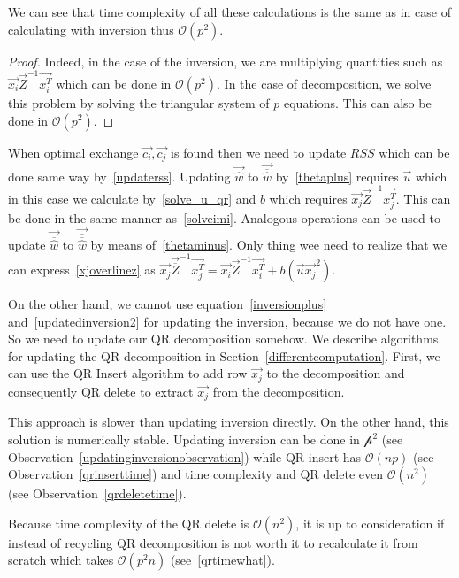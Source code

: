 \begin{observation}
We can see that time complexity of all these calculations is the same as in case of calculating with inversion thus $\mathcal{O}(p^2)$.
\end{observation}

\begin{proof}
Indeed, in the case of the inversion, we are multiplying quantities such as $\vec{x_i}\vec{Z}^{-1}\vec{x_i^T}$ which can be done in $\mathcal{O}(p^2)$.
In the case of decomposition, we solve this problem by solving the triangular system of $p$ equations. This can also be done in $\mathcal{O}(p^2)$.
\end{proof}

When optimal exchange $\vec{c_i}, \vec{c_j}$ is found then we need to update $RSS$ which can be done same way by~\eqref{updaterss}. Updating $\vec{\hat{w}}$ to  $\vec{\overline{\hat{w}}}$ by~\eqref{thetaplus} requires
$\vec{u}$  which in this case we calculate by~\eqref{solve_u_qr} and $b$ which requires  $\vec{x_j}\vec{Z}^{-1}\vec{x_j^T}$. This can be done in the same manner as~\eqref{solveimi}. Analogous operations can be used to update $\vec{\overline{\hat{w}}}$ to $\vec{\overline{\overline{\hat{w}}}}$  by means of~\eqref{thetaminus}. Only thing wee need to realize that we can express~\eqref{xjoverlinez} as $\vec{x_j}\vec{\overline{{Z}}}^{-1}\vec{x_j^T} = \vec{x_i}\vec{{{Z}}}^{-1}\vec{x_i^T} + b(\vec{u}\vec{x_j}^2)$.

On the other hand, we cannot use equation~\eqref{inversionplus} and~\eqref{updatedinversion2} for updating the inversion, because we do not have one. So we need to update our QR decomposition somehow. 
We describe algorithms for updating the QR decomposition in Section~\ref{differentcomputation}. 
First, we can use the QR Insert algorithm to add row $\vec{x_j}$ to the decomposition and consequently QR delete to extract $\vec{x_j}$  from the decomposition. 

\begin{observation}
This approach is slower than updating inversion directly. On the other hand, this solution is numerically stable. Updating inversion can be done in $\mathcal{p^2}$ (see Observation~\ref{updatinginversionobservation})  while QR insert has $\mathcal{O}(np)$ (see Observation~\ref{qrinserttime}) and time complexity and QR delete even $\mathcal{O}(n^2)$ (see Observation~\ref{qrdeletetime}).
\end{observation}

\begin{note}
Because time complexity of the QR delete is $\mathcal{O}(n^2)$, it is up to consideration if instead of recycling QR decomposition is not worth it to recalculate it from scratch which takes $\mathcal{O}(p^2n)$ (see~\eqref{qrtimewhat}).
\end{note}



